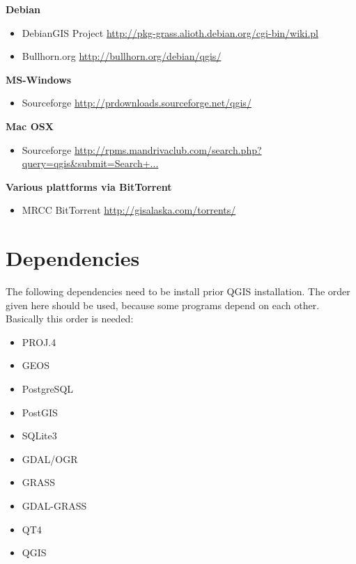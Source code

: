 \textbf{Debian}

\begin{itemize}
\item DebianGIS Project \url{http://pkg-grass.alioth.debian.org/cgi-bin/wiki.pl}
\item Bullhorn.org \url{http://bullhorn.org/debian/qgis/}
\end{itemize}

\textbf{MS-Windows}

\begin{itemize}
\item Sourceforge \url{http://prdownloads.sourceforge.net/qgis/}
\end{itemize}

\textbf{Mac OSX}

\begin{itemize}
\item Sourceforge \url{http://rpms.mandrivaclub.com/search.php?query=qgis&submit=Search+...}
\end{itemize}

\textbf{Various plattforms via BitTorrent}

\begin{itemize}
\item MRCC BitTorrent \url{http://gisalaska.com/torrents/}
\end{itemize}


\section{Dependencies}\label{label_dependencies}

The following dependencies need to be install prior QGIS installation.
The order given here should be used, because some programs depend on
each other. Basically this order is needed:
\begin{itemize}
\item PROJ.4
\item GEOS
\item PostgreSQL
\item PostGIS
\item SQLite3
\item GDAL/OGR
\item GRASS
\item GDAL-GRASS
\item QT4
\item QGIS
\end{itemize}

